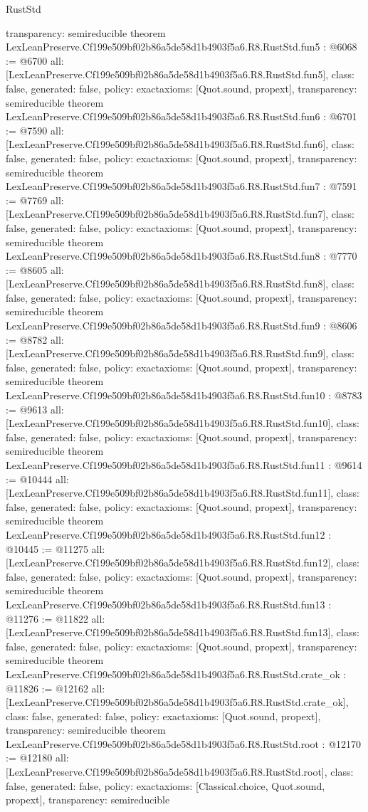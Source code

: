 \begin{lexlean}{RustStd}
\begin{coremodule}
{  transparency: semireducible
}
theorem LexLeanPreserve.Cf199e509bf02b86a5de58d1b4903f5a6.R8.RustStd.fun5 : @6068 := @6700 {
  all: [LexLeanPreserve.Cf199e509bf02b86a5de58d1b4903f5a6.R8.RustStd.fun5],
  class: false,
  generated: false,
  policy: exact{axioms: [Quot.sound, propext]},
  transparency: semireducible
}
theorem LexLeanPreserve.Cf199e509bf02b86a5de58d1b4903f5a6.R8.RustStd.fun6 : @6701 := @7590 {
  all: [LexLeanPreserve.Cf199e509bf02b86a5de58d1b4903f5a6.R8.RustStd.fun6],
  class: false,
  generated: false,
  policy: exact{axioms: [Quot.sound, propext]},
  transparency: semireducible
}
theorem LexLeanPreserve.Cf199e509bf02b86a5de58d1b4903f5a6.R8.RustStd.fun7 : @7591 := @7769 {
  all: [LexLeanPreserve.Cf199e509bf02b86a5de58d1b4903f5a6.R8.RustStd.fun7],
  class: false,
  generated: false,
  policy: exact{axioms: [Quot.sound, propext]},
  transparency: semireducible
}
theorem LexLeanPreserve.Cf199e509bf02b86a5de58d1b4903f5a6.R8.RustStd.fun8 : @7770 := @8605 {
  all: [LexLeanPreserve.Cf199e509bf02b86a5de58d1b4903f5a6.R8.RustStd.fun8],
  class: false,
  generated: false,
  policy: exact{axioms: [Quot.sound, propext]},
  transparency: semireducible
}
theorem LexLeanPreserve.Cf199e509bf02b86a5de58d1b4903f5a6.R8.RustStd.fun9 : @8606 := @8782 {
  all: [LexLeanPreserve.Cf199e509bf02b86a5de58d1b4903f5a6.R8.RustStd.fun9],
  class: false,
  generated: false,
  policy: exact{axioms: [Quot.sound, propext]},
  transparency: semireducible
}
theorem LexLeanPreserve.Cf199e509bf02b86a5de58d1b4903f5a6.R8.RustStd.fun10 : @8783 := @9613 {
  all: [LexLeanPreserve.Cf199e509bf02b86a5de58d1b4903f5a6.R8.RustStd.fun10],
  class: false,
  generated: false,
  policy: exact{axioms: [Quot.sound, propext]},
  transparency: semireducible
}
theorem LexLeanPreserve.Cf199e509bf02b86a5de58d1b4903f5a6.R8.RustStd.fun11 : @9614 := @10444 {
  all: [LexLeanPreserve.Cf199e509bf02b86a5de58d1b4903f5a6.R8.RustStd.fun11],
  class: false,
  generated: false,
  policy: exact{axioms: [Quot.sound, propext]},
  transparency: semireducible
}
theorem LexLeanPreserve.Cf199e509bf02b86a5de58d1b4903f5a6.R8.RustStd.fun12 : @10445 := @11275 {
  all: [LexLeanPreserve.Cf199e509bf02b86a5de58d1b4903f5a6.R8.RustStd.fun12],
  class: false,
  generated: false,
  policy: exact{axioms: [Quot.sound, propext]},
  transparency: semireducible
}
theorem LexLeanPreserve.Cf199e509bf02b86a5de58d1b4903f5a6.R8.RustStd.fun13 : @11276 := @11822 {
  all: [LexLeanPreserve.Cf199e509bf02b86a5de58d1b4903f5a6.R8.RustStd.fun13],
  class: false,
  generated: false,
  policy: exact{axioms: [Quot.sound, propext]},
  transparency: semireducible
}
theorem LexLeanPreserve.Cf199e509bf02b86a5de58d1b4903f5a6.R8.RustStd.crate_ok : @11826 := @12162 {
  all: [LexLeanPreserve.Cf199e509bf02b86a5de58d1b4903f5a6.R8.RustStd.crate_ok],
  class: false,
  generated: false,
  policy: exact{axioms: [Quot.sound, propext]},
  transparency: semireducible
}
theorem LexLeanPreserve.Cf199e509bf02b86a5de58d1b4903f5a6.R8.RustStd.root : @12170 := @12180 {
  all: [LexLeanPreserve.Cf199e509bf02b86a5de58d1b4903f5a6.R8.RustStd.root],
  class: false,
  generated: false,
  policy: exact{axioms: [Classical.choice, Quot.sound, propext]},
  transparency: semireducible
}


\end{coremodule}
\end{lexlean}
